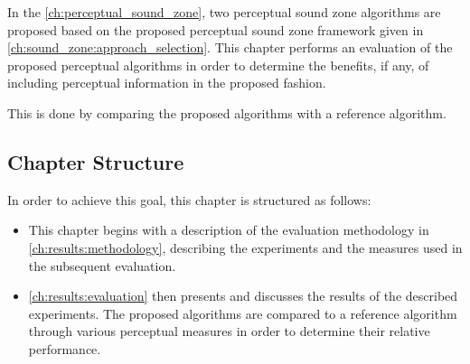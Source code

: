 In the \autoref{ch:perceptual_sound_zone}, two perceptual sound zone algorithms are proposed based 
on the proposed perceptual sound zone framework given in \autoref{ch:sound_zone:approach_selection}.
This chapter performs an evaluation of the proposed perceptual algorithms in order to determine the benefits, 
if any, of including perceptual information in the proposed fashion.

This is done by comparing the proposed algorithms with a reference algorithm.

\subsection*{Chapter Structure}
In order to achieve this goal, this chapter is structured as follows:

\begin{itemize}
    \item This chapter begins with a description of the evaluation methodology in 
        \autoref{ch:results:methodology}, describing the experiments 
        and the measures used in the subsequent evaluation.
    \item \autoref{ch:results:evaluation} then presents and discusses the results of the described experiments. 
        The proposed algorithms are compared to a reference algorithm through various perceptual measures in order to determine their relative performance.
\end{itemize}
